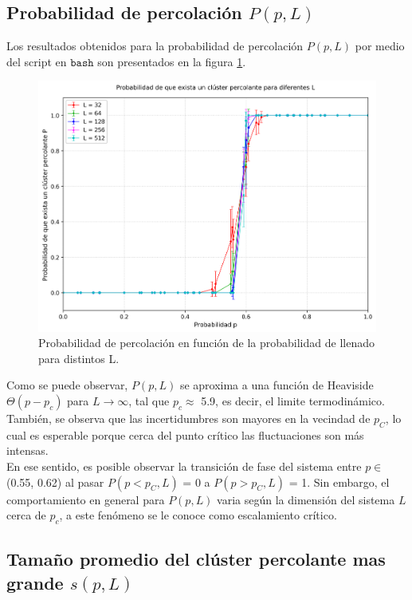 \documentclass[12pt,a4paper]{article}
\begin{document}
\subsection{Probabilidad de percolación $P(p,L)$}

Los resultados obtenidos para la probabilidad de percolación $P(p,L)$ por medio del script en $\texttt{bash}$ son presentados en la figura \ref{fig:5}.

\begin{figure}[H]
    \centering
   \includegraphics[width=1.0\linewidth]{../figures/P_all_L.png}
   \caption{Probabilidad de percolación en función de la probabilidad de llenado para distintos L.}
    \label{fig:5}
\end{figure}

Como se puede observar, $P(p,L)$ se aproxima a una función de Heaviside $\Theta(p-p_c)$ para $L\rightarrow\infty$, tal que $p_c\approx$ 5.9, es decir, el limite termodinámico. También, se observa que las incertidumbres son mayores en la vecindad de $p_C$, lo cual es esperable porque cerca del punto crítico las fluctuaciones son más intensas.
\\

En ese sentido, es posible observar la transición de fase del sistema entre $p\in$(0.55, 0.62) al pasar $P(p<p_C,L)$ = 0 a $P(p>p_C,L)$ = 1. Sin embargo, el comportamiento en general para $P(p,L)$ varia según la dimensión del sistema $L$ cerca de $p_c$, a este fenómeno se le conoce como escalamiento crítico.

\subsection{Tamaño promedio del clúster percolante mas grande $s(p,L)$}
\end{document}
